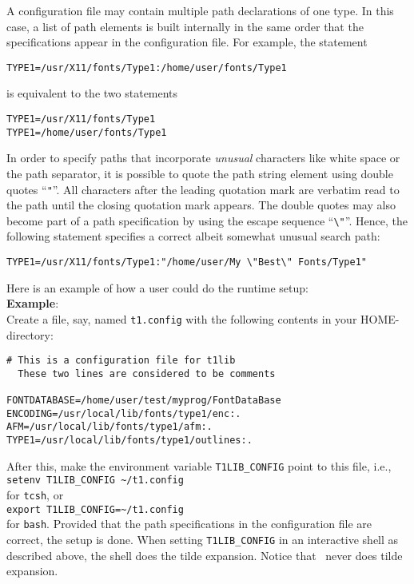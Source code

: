 A configuration file may contain multiple path declarations of one type. In this
case, a list of path elements is built internally in the same order that the
specifications appear in the configuration file. For example, the statement 
\begin{verbatim}
TYPE1=/usr/X11/fonts/Type1:/home/user/fonts/Type1
\end{verbatim}
is equivalent to the two statements
\begin{verbatim}
TYPE1=/usr/X11/fonts/Type1
TYPE1=/home/user/fonts/Type1
\end{verbatim}

In order to specify paths that incorporate {\em unusual} characters like white
space or the path separator, it is possible to quote the path string element
using double quotes ``\verb+"+''. All characters after the leading quotation
mark are verbatim read to the path until the closing quotation mark
appears. The double quotes may also become part of a path 
specification by using the escape sequence ``\verb+\"+''. Hence, the following
statement specifies a correct albeit somewhat unusual search path:
\begin{verbatim}
TYPE1=/usr/X11/fonts/Type1:"/home/user/My \"Best\" Fonts/Type1"
\end{verbatim}

Here is an example of how a user could do the runtime setup: \\[2mm]
{\bfseries Example}: \\
Create a file, say, named \verb+t1.config+ with the following
contents in your HOME-directory:
\begin{verbatim}
# This is a configuration file for t1lib
  These two lines are considered to be comments

FONTDATABASE=/home/user/test/myprog/FontDataBase
ENCODING=/usr/local/lib/fonts/type1/enc:.
AFM=/usr/local/lib/fonts/type1/afm:.
TYPE1=/usr/local/lib/fonts/type1/outlines:.
\end{verbatim}
After this, make the environment variable \verb+T1LIB_CONFIG+  point
to this file, i.e., \\
\verb+setenv T1LIB_CONFIG ~/t1.config+\\
 for \verb+tcsh+, or\\ 
\verb+export T1LIB_CONFIG=~/t1.config+\\
for \verb+bash+. Provided that the path specifications in the
configuration file are correct, the setup is done. When setting
\verb+T1LIB_CONFIG+ in an interactive shell as described above, the shell does
the tilde expansion. Notice that \tonelib\ never does tilde expansion.



